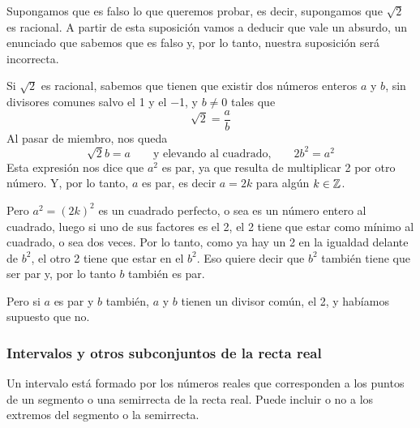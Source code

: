 \documentclass[../teoria.root.tex]{subfiles}
\begin{document}
Supongamos que es falso lo que queremos probar, es decir, supongamos que \(\sqrt{2}\) es racional.
A partir de esta suposición vamos a deducir que vale un absurdo, un enunciado que sabemos que es falso y, por lo tanto, nuestra suposición será incorrecta.

Si \(\sqrt{2}\) es racional, sabemos que tienen que existir dos números enteros \(a\) y \(b\), sin divisores comunes salvo el 1 y el −1, y \(b \neq 0\) tales que \[\sqrt{2}=\frac{a}{b}\] Al pasar de miembro, nos queda
\[\sqrt{2}b=a\qquad\text{y elevando al cuadrado,}\qquad 2b^2=a^2\]
Esta expresión nos dice que \(a^2\) es par, ya que resulta de multiplicar 2 por otro número.
Y, por lo tanto, \(a\) es par, es decir \(a = 2k\) para algún \(k \in \mathbb{Z}\).

Pero \(a^2 = (2k)^2\) es un cuadrado perfecto, o sea es un número entero al cuadrado, luego si uno de sus factores es el 2, el 2 tiene que estar como mínimo al cuadrado, o sea dos veces.
Por lo tanto, como ya hay un 2 en la igualdad delante de \(b^2\), el otro 2 tiene que estar en el \(b^2\).
Eso quiere decir que \(b^2\) también tiene que ser par y, por lo tanto \(b\) también es par.

Pero si \(a\) es par y \(b\) también, \(a\) y \(b\) tienen un divisor común, el 2, y habíamos supuesto que no.
\subsubsection{Intervalos y otros subconjuntos de la recta real}
Un intervalo está formado por los números reales que corresponden a los puntos de un segmento o una semirrecta de la recta real.
Puede incluir o no a los extremos del segmento o la semirrecta.
\end{document}
